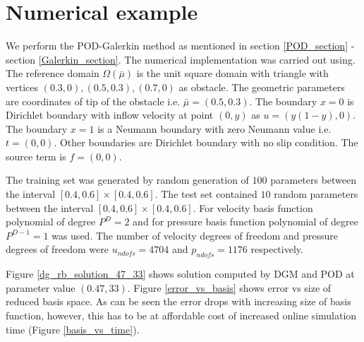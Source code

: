 \documentclass[graybox]{svmult}
\begin{document}
\section{Numerical example}

We perform the POD-Galerkin method as mentioned in section \ref{POD_section} - section \ref{Galerkin_section}. The numerical implementation was carried out using. The reference domain $\Omega({\bar{\mu}})$ is the unit square domain with triangle with vertices $(0.3,0),(0.5,0.3),(0.7,0)$ as obstacle. The geometric parameters are coordinates of tip of the obstacle i.e. $\bar{\mu} = (0.5,0.3)$. The boundary ${x=0}$ is Dirichlet boundary with inflow velocity at point $(0,y)$ as $u = (y(1-y), 0)$. The boundary ${x = 1}$ is a Neumann boundary with zero Neumann value i.e. $t = (0, 0)$. Other boundaries are Dirichlet boundary with no slip condition. The source term is $f = (0,0)$.

The training set was generated by random generation of $100$ parameters between the interval $[0.4,0.6] \times [0.4,0.6]$. The test set contained $10$ random parameters between the interval $[0.4,0.6] \times [0.4,0.6]$. For velocity basis function polynomial of degree $P^D = 2$ and for pressure basis function polynomial of degree $P^{D-1} = 1$ was used. The number of velocity degrees of freedom and pressure degrees of freedom were $u_{ndofs} = 4704$ and $p_{ndofs} = 1176$ respectively.

Figure \ref{dg_rb_solution_47_33} shows solution computed by DGM and POD at parameter value $(0.47,33)$. Figure \ref{error_vs_basis} shows error vs size of reduced basis space. As can be seen the error drops with increasing size of basis function, however, this has to be at affordable cost of increased online simulation time (Figure \ref{basis_vs_time}).
\end{document}
